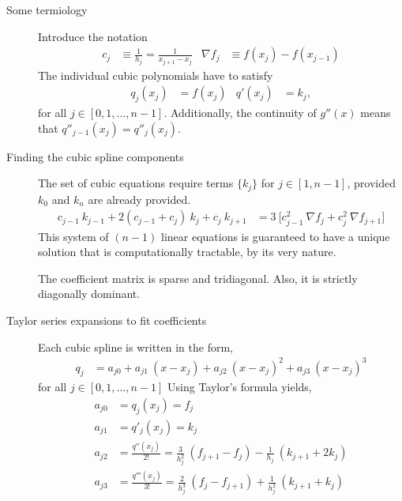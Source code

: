 \begin{description}
    \item[Some termiology] Introduce the notation
        \begin{align}
            c_j        & \equiv \frac{1}{h_j} = \frac{1}{x_{j+1} - x_j} &
            \nabla f_j & \equiv f(x_j) - f(x_{j-1})
        \end{align}
        The individual cubic polynomials have to satisfy
        \begin{align}
            q_j(x_j) & = f(x_j) &
            q'(x_j)  & = k_j,
        \end{align}
        for all $ j \in [0,1,\dots,n-1] $. Additionally, the continuity of $ g''(x) $
        means that $ q''_{j-1}(x_j) = q''_j(x_j) $.

    \item[Finding the cubic spline components]
        The set of cubic equations require terms $ \{k_j\} $ for $ j \in [1, n-1] $,
        provided $ k_0 $ and $ k_n $ are already provided.
        \begin{align}
            c_{j-1}\ k_{j-1} + 2(c_{j-1} + c_j)\ k_j + c_j\ k_{j+1}
             & = 3\ \Big[ c^2_{j-1}\ \nabla f_j + c_j^2\ \nabla f_{j+1} \Big]
        \end{align}
        This system of $ (n-1) $ linear equations is guaranteed to have a unique
        solution that is computationally tractable, by its very nature. \par
        The coefficient matrix is sparse and tridiagonal. Also, it is strictly
        diagonally dominant.

    \item[Taylor series expansions to fit coefficients] Each cubic spline is written in
        the form,
        \begin{align}
            q_j & = a_{j0} + a_{j1}\ (x - x_j) + a_{j2}\ (x - x_j)^2 + a_{j3}
            \ (x - x_j)^3
        \end{align}
        for all $ j \in [0,1,\dots,n-1] $
        Using Taylor's formula yields,
        \begin{align}
            a_{j0} & = q_j(x_j) = f_j                                            \\
            a_{j1} & = q'_j(x_j) = k_j                                           \\
            a_{j2} & = \frac{q''(x_j)}{2!} = \frac{3}{h_j^2}\ (f_{j+1} - f_j)
            - \frac{1}{h_j}\ (k_{j+1} + 2k_j)                                    \\
            a_{j3} & = \frac{q'''(x_j)}{3!} = \frac{2}{h_j^3}\ (f_{j} - f_{j+1})
            + \frac{1}{h_j^2}\ (k_{j+1} + k_j)
        \end{align}


\end{description}

